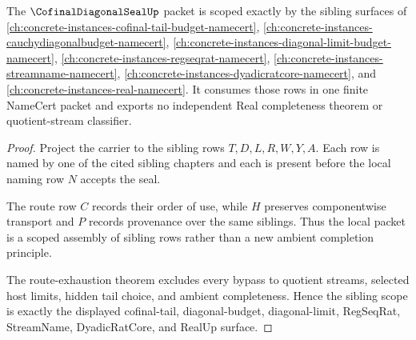 \begin{theorem}
\label{thm:cofinal-diagonal-seal-sibling-scope}
The $\CofinalDiagonalSealUp$ packet is scoped exactly by the sibling surfaces of \autoref{ch:concrete-instances-cofinal-tail-budget-namecert}, \autoref{ch:concrete-instances-cauchydiagonalbudget-namecert}, \autoref{ch:concrete-instances-diagonal-limit-budget-namecert}, \autoref{ch:concrete-instances-regseqrat-namecert}, \autoref{ch:concrete-instances-streamname-namecert}, \autoref{ch:concrete-instances-dyadicratcore-namecert}, and \autoref{ch:concrete-instances-real-namecert}. It consumes those rows in one finite NameCert packet and exports no independent Real completeness theorem or quotient-stream classifier.
\end{theorem}
\begin{proof}
Project the carrier to the sibling rows $T,D,L,R,W,Y,A$. Each row is named by one of the cited sibling chapters and each is present before the local naming row $N$ accepts the seal.

The route row $C$ records their order of use, while $H$ preserves componentwise transport and $P$ records provenance over the same siblings. Thus the local packet is a scoped assembly of sibling rows rather than a new ambient completion principle.

The route-exhaustion theorem excludes every bypass to quotient streams, selected host limits, hidden tail choice, and ambient completeness. Hence the sibling scope is exactly the displayed cofinal-tail, diagonal-budget, diagonal-limit, RegSeqRat, StreamName, DyadicRatCore, and RealUp surface.
\end{proof}

